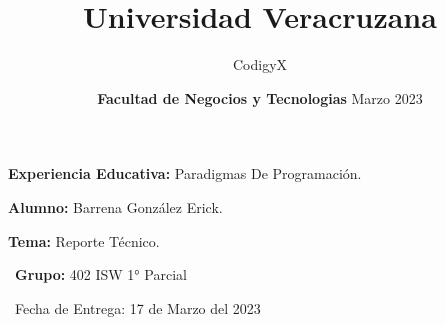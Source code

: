 \documentclass{article}
\title{\textbf{Universidad Veracruzana} }
\date{\textbf{Facultad de Negocios y Tecnologias} }
\begin{document}
\maketitle
\textsf{\Large \textbf{Experiencia Educativa:} Paradigmas De Programación.\\}
 
\maketitle
\textsf{\Large \textbf{Alumno:} Barrena González Erick. \\}

\maketitle
\textsf{\Large \textbf{Tema:} Reporte Técnico. \\}

\textsf{\ \textbf{Grupo:} 402 ISW 1° Parcial \\}

\maketitle

\textsf{\ Fecha de Entrega: 17 de Marzo del 2023 \\}

\author{CodigyX}
\date{Marzo 2023}

\newpage
\end{document}
